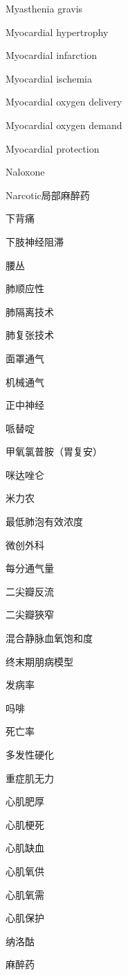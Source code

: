 \documentclass[10pt]{article}
\begin{document}
Myasthenia gravis

Myocardial hypertrophy

Myocardial infarction

Myocardial ischemia

Myocardial oxygen delivery

Myocardial oxygen demand

Myocardial protection

Naloxone

Narcotic局部麻醉药

下背痛

下肢神经阻滞

腰丛

肺顺应性

肺隔离技术

肺复张技术

面罩通气

机械通气

正中神经

哌替啶

甲氧氯普胺（胃复安）

咪达唑仑

米力农

最低肺泡有效浓度

微创外科

每分通气量

二尖瓣反流

二尖瓣狹窄

混合静脉血氧饱和度

终末期朋病模型

发病率

吗啡

死亡率

多发性硬化

重症肌无力

心肌肥厚

心肌梗死

心肌缺血

心肌氧供

心肌氧需

心肌保护

纳洛酤

麻醉药
\end{document}
